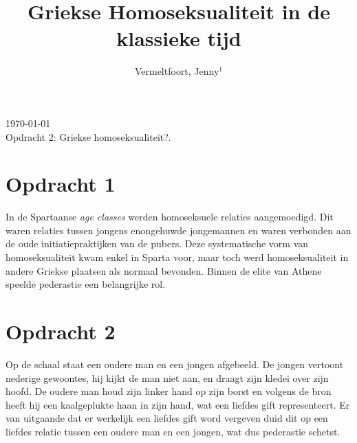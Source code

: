 \documentclass[11pt]{amsart}
\begin{document}
\setcounter{page}{1}

\hfill     {\small \today} \\
{\small Opdracht 2: Griekse homoseksualiteit?.}\hfill
{\small } %

\centerline{}

\centerline{}

\title[Griekse Homoseksualiteit]{Griekse Homoseksualiteit in de klassieke tijd}

\author[J. Vermeltfoort]{Vermeltfoort, Jenny$^1$}

\address{$^{1}$ 3787494, Faculteit Geesteswetenschappen, Leiden
     Universiteit, Leiden, Nederland.}
\email{\textcolor[rgb]{0.00,0.00,0.84}{j.vermeltfoort@umail.leidenuniv.nl}}


\maketitle

\section*{Opdracht 1}

\noindent In de Spartaanse \textit{age classes} werden homoseksuele relaties aangemoedigd. Dit waren relaties tussen jongens
enongehuwde jongemannen en waren verbonden aan de oude initiatiepraktijken van de pubers. Deze systematische vorm van
homoseksualiteit kwam enkel in Sparta voor, maar toch werd homoseksualiteit in andere Griekse plaatsen als normaal
bevonden. Binnen de elite van Athene speelde pederastie een belangrijke
rol.\autocite{naereboutOudheidGriekenRomeinen2022}

\section*{Opdracht 2}
\noindent Op de schaal \autocite{dourisAtticRedFigure} staat een oudere man en een jongen afgebeeld. De jongen vertoont nederige
gewoontes, hij kijkt de man niet aan, en draagt zijn kledei over zijn hoofd. De oudere man houd zijn linker hand op
zijn borst en volgens de bron \autocite{dourisAtticRedFigure} heeft hij een kaalgeplukte haan in zijn hand, wat een
liefdes gift representeert. Er van uitgaande dat er werkelijk een liefdes gift word vergeven duid dit op een liefdes
relatie tussen een oudere man en een jongen, wat dus pederastie schetst.
\end{document}
